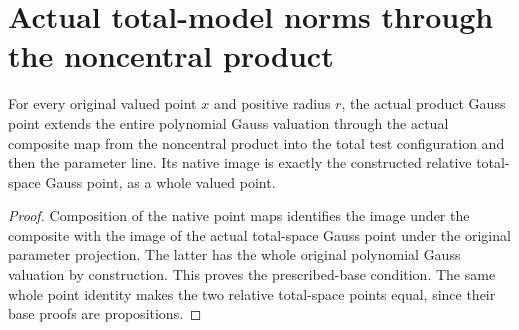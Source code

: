 \section{Actual total-model norms through the noncentral product}

\begin{theorem}\label{thm:native-tc-product-polynomial-gauss-source}
\leanok
For every original valued point $x$ and positive radius $r$, the
actual product Gauss point extends the entire polynomial Gauss
valuation through the actual composite map from the noncentral
product into the total test configuration and then the parameter
line. Its native image is exactly the constructed
relative total-space Gauss point, as a whole valued point.
\end{theorem}
\begin{proof}
Composition of the native point maps identifies the image under
the composite with the image of the actual total-space Gauss point
under the original parameter projection. The latter has the whole
original polynomial Gauss valuation by construction. This proves
the prescribed-base condition. The same whole point identity makes
the two relative total-space points equal, since their base proofs
are propositions.
\end{proof}

